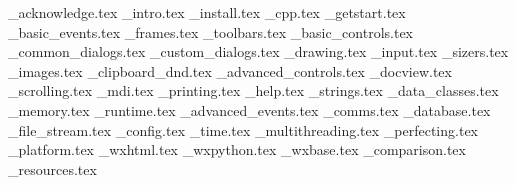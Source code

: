 \_acknowledge.tex
%
\_intro.tex
%
\_install.tex
%
\_cpp.tex
%
\_getstart.tex
%
\_basic\_events.tex
%
\_frames.tex
%
\_toolbars.tex
%
\_basic\_controls.tex
%
\_common\_dialogs.tex
%
\_custom\_dialogs.tex
%
\_drawing.tex
%
\_input.tex
%
%
\_sizers.tex
%
\_images.tex
%
\_clipboard\_dnd.tex
%
\_advanced\_controls.tex
%
\_docview.tex
%
\_scrolling.tex
%
\_mdi.tex
%
\_printing.tex
%
\_help.tex
%
\_strings.tex
%
\_data\_classes.tex
%
\_memory.tex
%
\_runtime.tex
%
\_advanced\_events.tex
%
\_comms.tex
%
\_database.tex
%
\_file\_stream.tex
%
\_config.tex
%
\_time.tex
%
\_multithreading.tex
%
\_perfecting.tex
%
\_platform.tex
%
\_wxhtml.tex
%
\_wxpython.tex
%
\_wxbase.tex
%
\_comparison.tex
%
\_resources.tex

